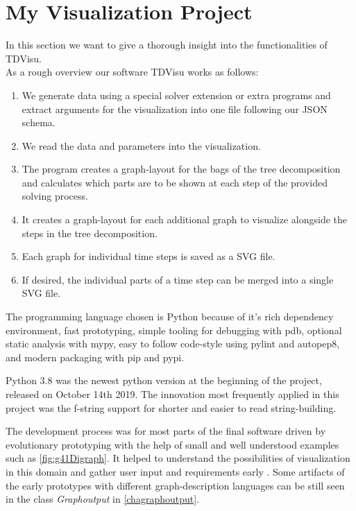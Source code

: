 \documentclass[a4paper, 12pt, bibliography=totoc]{scrartcl}
\begin{document}
\newpage
\section{My Visualization Project}\label{sec:project}

In this section we want to give a thorough insight into the functionalities of TDVisu.\\

\noindent As a rough overview our software TDVisu works as follows:

\begin{enumerate}
	\item We generate data using a special solver extension or extra programs and extract arguments for the visualization into one file following our JSON schema.
	\item We read the data and parameters into the visualization.
	\item The program creates a graph-layout for the bags of the tree decomposition and calculates which parts are to be shown at each step of the provided solving process.
	\item It creates a graph-layout for each additional graph to visualize alongside the steps in the tree decomposition.
	\item Each graph for individual time steps is saved as a SVG file.
	\item If desired, the individual parts of a time step can be merged into a single SVG file.
\end{enumerate}

The programming language chosen is Python because of it's rich dependency environment, fast prototyping, simple tooling for debugging with pdb, optional static analysis with mypy, easy to follow code-style using pylint and autopep8, and modern packaging with pip and pypi.

Python 3.8 was the newest python version at the beginning of the project, released on October 14th 2019. The innovation most frequently applied in this project was the f-string support for shorter and easier to read string-building. %

The development process was for most parts of the final software driven by evolutionary prototyping with the help of small and well understood examples such as \ref{fig:g41Digraph}. It helped to understand the possibilities of visualization in this domain and gather user input and requirements early \cite{rapidPrototypingOvermyer}. Some artifacts of the early prototypes with different graph-description languages can be still seen in the class \textit{Graphoutput} in \ref{chagraphoutput}.
\end{document}
